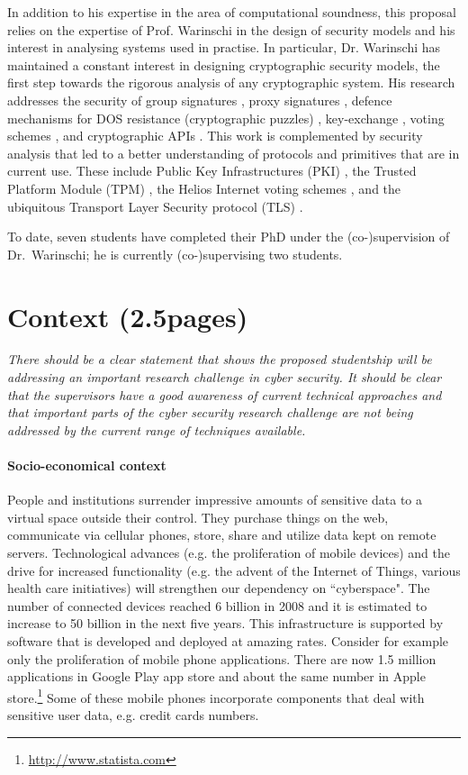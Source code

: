 \documentclass[10pt]{article}
\begin{document}
In addition to his expertise in the area of computational soundness, this proposal relies on the expertise of Prof. Warinschi in the design of security models and his interest in analysing systems used in practise.  In particular, Dr. Warinschi has maintained a constant interest in designing cryptographic security models, the first step towards the rigorous analysis of any cryptographic system. 
His research addresses the security of group signatures \cite{BMW03}, proxy signatures \cite{proxies}, defence mechanisms for DOS resistance (cryptographic puzzles) \cite{puzzles},  key-exchange \cite{ke}, voting schemes \cite{helios}, and cryptographic APIs \cite{KSW11}.
This work is complemented by security analysis that led to a better understanding of protocols and primitives that are in current use.  These include Public Key Infrastructures (PKI) \cite{boldyreva07acloser}, the Trusted Platform Module (TPM) \cite{pcas}, the Helios Internet voting schemes \cite{helios}, and the ubiquitous Transport Layer Security protocol (TLS) \cite{tls}. 

To date, seven students have completed their PhD under the (co-)supervision of Dr.~Warinschi; he is currently (co-)supervising two 
students.


\section{Context (2.5pages)}
\emph{There should be a clear statement that shows the proposed studentship will be addressing an important research challenge in cyber security. It should be clear that the supervisors have a good awareness of current technical approaches and that important parts of the cyber security research challenge are not being addressed by the current range of techniques available.}


\paragraph{Socio-economical context}
People and institutions surrender impressive amounts of sensitive data to a virtual space outside
their control.
They purchase things on the web, communicate via cellular phones, store, share and utilize data kept on remote servers.
Technological advances (e.g. the proliferation of mobile devices) and the drive for increased
functionality (e.g. the advent of the Internet of Things, various health care initiatives) will
strengthen our dependency on ``cyberspace".
The number of connected devices reached 6 billion in 2008 and it is estimated to increase to 50
billion in the next five years.
This infrastructure is supported by software that is developed and deployed at amazing rates. 
Consider for example only the proliferation of mobile phone applications.
There are now 1.5 million applications in Google Play app store and about the same
number in Apple store.\footnote{\url{http://www.statista.com}}
Some of these mobile phones incorporate components that deal with sensitive user data, e.g. credit cards numbers.   
\end{document}
